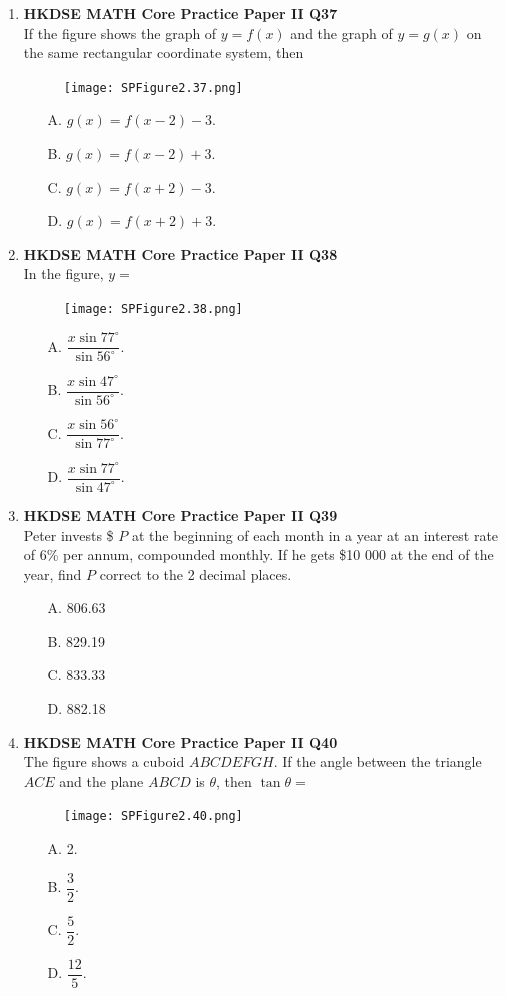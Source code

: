 \documentclass[12pt]{article}
\begin{document}
\begin{enumerate}
	\item \textbf{HKDSE MATH Core Practice Paper II Q37}\\
	If the figure shows the graph of $y = f(x)$ and the graph of $y = g(x)$ on the same rectangular coordinate system, then
	\begin{figure}[H]
		\centering
		\texttt{[image: SPFigure2.37.png]}	
	\end{figure}
	\begin{enumerate}
		\item[A.] $g(x) = f(x - 2) - 3$.
		\item[B.] $g(x) = f(x - 2) + 3$.
		\item[C.] $g(x) = f(x + 2) - 3$.
		\item[D.] $g(x) = f(x + 2) + 3$.
	\end{enumerate}
	
	\item \textbf{HKDSE MATH Core Practice Paper II Q38}\\
	In the figure, $y = $
	\begin{figure}[H]
		\centering
		\texttt{[image: SPFigure2.38.png]}	
	\end{figure}
	\begin{enumerate}
		\item[A.] $\dfrac{x\sin{77^\circ}}{\sin{56^\circ}}$.
		\item[B.] $\dfrac{x\sin{47^\circ}}{\sin{56^\circ}}$.
		\item[C.] $\dfrac{x\sin{56^\circ}}{\sin{77^\circ}}$.
		\item[D.] $\dfrac{x\sin{77^\circ}}{\sin{47^\circ}}$.
	\end{enumerate}
	
	\item \textbf{HKDSE MATH Core Practice Paper II Q39}\\
	Peter invests \$ $P$ at the beginning of each month in a year at an interest rate of 6\% per annum, compounded monthly. If he gets \$10 000 at the end of the year, find $P$ correct to the 2 decimal places.
	\begin{enumerate}
		\item[A.] 806.63
		\item[B.] 829.19
		\item[C.] 833.33
		\item[D.] 882.18
	\end{enumerate}
	
	\item \textbf{HKDSE MATH Core Practice Paper II Q40}\\
	The figure shows a cuboid $ABCDEFGH$. If the angle between the triangle $ACE$ and the plane $ABCD$ is $\theta$, then $\tan{\theta} = $
	\begin{figure}[H]
		\centering
		\texttt{[image: SPFigure2.40.png]}	
	\end{figure}
	\begin{enumerate}
		\item[A.] 2.
		\item[B.] $\dfrac{3}{2}$.
		\item[C.] $\dfrac{5}{2}$.
		\item[D.] $\dfrac{12}{5}$.
	\end{enumerate}
	

\end{enumerate}
\end{document}
